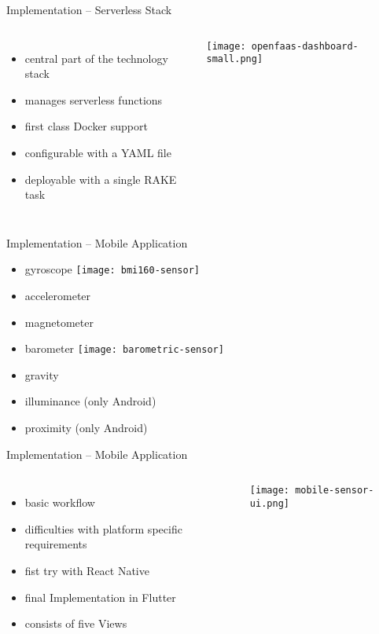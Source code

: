 \documentclass[aspectratio=169]{beamer}
\begin{document}
  \begin{frame}{Implementation -- Serverless Stack}
    \begin{columns}
        \begin{itemize}
          \item central part of the technology stack
          \item manages serverless functions
          \item first class Docker support
          \item configurable with a YAML file
          \item deployable with a single RAKE task
        \end{itemize}
        \vfill
        \centering
        \texttt{[image: openfaas-dashboard-small.png]}
     \end{columns}
  \end{frame}

  

  \begin{frame}{Implementation -- Mobile Application}
    \begin{itemize}
      \item gyroscope
            \hspace*{2em}
            \texttt{[image: bmi160-sensor]}
      \item accelerometer
      \item magnetometer
      \item barometer
            \hspace*{2em}
            \texttt{[image: barometric-sensor]}
      \item gravity
      \item illuminance (only Android)
      \item proximity (only Android)
    \end{itemize}
  \end{frame}

  \begin{frame}{Implementation -- Mobile Application}
    \begin{columns}
        \begin{itemize}
          \item basic workflow
          \item difficulties with platform specific requirements
          \item fist try with React Native
          \item final Implementation in Flutter
          \item consists of five Views
        \end{itemize}
        \vfill
        \vspace*{2em}
        \centering
        \texttt{[image: mobile-sensor-ui.png]}
     \end{columns}
  \end{frame}
\end{document}
